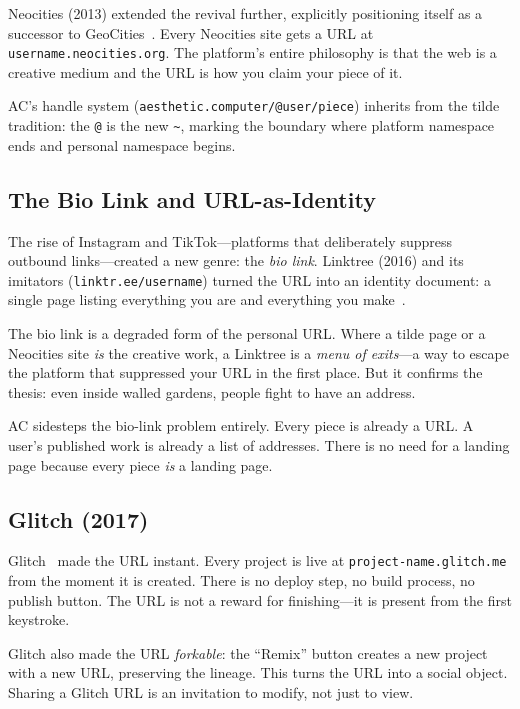 \documentclass[10pt,letterpaper,twocolumn]{article}
\newcommand{\code}[1]{\texttt{#1}}
\begin{document}
Neocities (2013) extended the revival further, explicitly positioning itself as a successor to GeoCities~\citep{neocities2013}. Every Neocities site gets a URL at \code{username.neocities.org}. The platform's entire philosophy is that the web is a creative medium and the URL is how you claim your piece of it.

AC's handle system (\code{aesthetic.computer/@user/piece}) inherits from the tilde tradition: the \code{@} is the new \code{\textasciitilde{}}, marking the boundary where platform namespace ends and personal namespace begins.

\subsection{The Bio Link and URL-as-Identity}

The rise of Instagram and TikTok---platforms that deliberately suppress outbound links---created a new genre: the \emph{bio link}. Linktree (2016) and its imitators (\code{linktr.ee/username}) turned the URL into an identity document: a single page listing everything you are and everything you make~\citep{zaccaria2016linktree}.

The bio link is a degraded form of the personal URL. Where a tilde page or a Neocities site \emph{is} the creative work, a Linktree is a \emph{menu of exits}---a way to escape the platform that suppressed your URL in the first place. But it confirms the thesis: even inside walled gardens, people fight to have an address.

AC sidesteps the bio-link problem entirely. Every piece is already a URL. A user's published work is already a list of addresses. There is no need for a landing page because every piece \emph{is} a landing page.

\subsection{Glitch (2017)}

Glitch~\citep{dash2017glitch} made the URL instant. Every project is live at \code{project-name.glitch.me} from the moment it is created. There is no deploy step, no build process, no publish button. The URL is not a reward for finishing---it is present from the first keystroke.

Glitch also made the URL \emph{forkable}: the ``Remix'' button creates a new project with a new URL, preserving the lineage. This turns the URL into a social object. Sharing a Glitch URL is an invitation to modify, not just to view.
\end{document}
